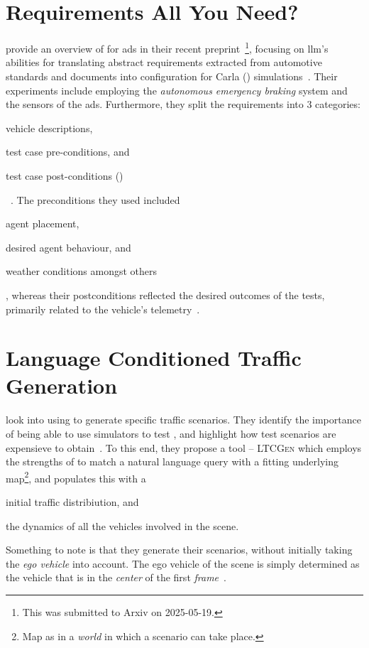 \section{Requirements All You Need?}

\citeauthor{requirementsAllYouNeed} provide an overview of  for \acrshort{ads} in
their recent preprint~\footnote{This was submitted to Arxiv on
    2025-05-19.}, focusing on \acrshort{llm}'s abilities for translating abstract requirements extracted
from automotive standards and documents into configuration for Carla ()
simulations~\cite{requirementsAllYouNeed}. Their experiments include employing the
\textit{autonomous emergency braking} system and the sensors of the \acrshort{ads}. Furthermore, they
split the requirements into \num{3} categories: \begin{inparaenum}
    \item vehicle descriptions,
    \item test case pre-conditions, and
    \item test case post-conditions ()
\end{inparaenum}~\cite{requirementsAllYouNeed}. The preconditions they used included
\begin{inparaenum}
    \item agent placement,
    \item desired agent behaviour, and
    \item weather conditions amongst others\end{inparaenum}, whereas their postconditions reflected
the desired outcomes of the tests, primarily related to the vehicle's
telemetry~\cite{requirementsAllYouNeed}.

\section{Language Conditioned Traffic Generation}

\citeauthor{languageconditionedtrafficgeneration} look into using  to generate
specific traffic scenarios. They identify the importance of being able to use simulators to test
, and highlight how test scenarios are expensieve to
obtain~\cite[1]{languageconditionedtrafficgeneration}. To this end, they propose a tool --
\textsc{LTCGen} which employs the strengths of  to match a natural language query
with a fitting underlying map\footnote{Map as in a \textit{world} in which a scenario can take
    place.}, and populates this with a \begin{inparaenum}
    \item initial traffic distribiution, and
    \item the dynamics of all the vehicles involved in the scene.
\end{inparaenum}
Something to note is that they generate their scenarios, without initially taking the \textit{ego
    vehicle} into account. The ego vehicle of the scene is simply determined as the vehicle that is
in the \textit{center} of the first
\textit{frame}~\cite[3]{languageconditionedtrafficgeneration}.

